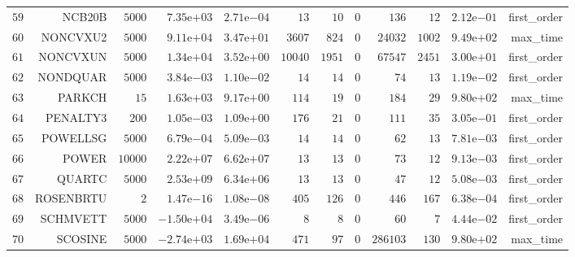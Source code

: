 \begin{longtable}{rrrrrrrrrrrr}
  \(    59\) & NCB20B & \(  5000\) & \( 7.35\)e\(+03\) & \( 2.71\)e\(-04\) & \(    13\) & \(    10\) & \(     0\) & \(   136\) & \(    12\) & \( 2.12\)e\(-01\) & first\_order \\
  \(    60\) & NONCVXU2 & \(  5000\) & \( 9.11\)e\(+04\) & \( 3.47\)e\(+01\) & \(  3607\) & \(   824\) & \(     0\) & \( 24032\) & \(  1002\) & \( 9.49\)e\(+02\) & max\_time \\
  \(    61\) & NONCVXUN & \(  5000\) & \( 1.34\)e\(+04\) & \( 3.52\)e\(+00\) & \( 10040\) & \(  1951\) & \(     0\) & \( 67547\) & \(  2451\) & \( 3.00\)e\(+01\) & first\_order \\
  \(    62\) & NONDQUAR & \(  5000\) & \( 3.84\)e\(-03\) & \( 1.10\)e\(-02\) & \(    14\) & \(    14\) & \(     0\) & \(    74\) & \(    13\) & \( 1.19\)e\(-02\) & first\_order \\
  \(    63\) & PARKCH & \(    15\) & \( 1.63\)e\(+03\) & \( 9.17\)e\(+00\) & \(   114\) & \(    19\) & \(     0\) & \(   184\) & \(    29\) & \( 9.80\)e\(+02\) & max\_time \\
  \(    64\) & PENALTY3 & \(   200\) & \( 1.05\)e\(-03\) & \( 1.09\)e\(+00\) & \(   176\) & \(    21\) & \(     0\) & \(   111\) & \(    35\) & \( 3.05\)e\(-01\) & first\_order \\
  \(    65\) & POWELLSG & \(  5000\) & \( 6.79\)e\(-04\) & \( 5.09\)e\(-03\) & \(    14\) & \(    14\) & \(     0\) & \(    62\) & \(    13\) & \( 7.81\)e\(-03\) & first\_order \\
  \(    66\) & POWER & \( 10000\) & \( 2.22\)e\(+07\) & \( 6.62\)e\(+07\) & \(    13\) & \(    13\) & \(     0\) & \(    73\) & \(    12\) & \( 9.13\)e\(-03\) & first\_order \\
  \(    67\) & QUARTC & \(  5000\) & \( 2.53\)e\(+09\) & \( 6.34\)e\(+06\) & \(    13\) & \(    13\) & \(     0\) & \(    47\) & \(    12\) & \( 5.08\)e\(-03\) & first\_order \\
  \(    68\) & ROSENBRTU & \(     2\) & \( 1.47\)e\(-16\) & \( 1.08\)e\(-08\) & \(   405\) & \(   126\) & \(     0\) & \(   446\) & \(   167\) & \( 6.38\)e\(-04\) & first\_order \\
  \(    69\) & SCHMVETT & \(  5000\) & \(-1.50\)e\(+04\) & \( 3.49\)e\(-06\) & \(     8\) & \(     8\) & \(     0\) & \(    60\) & \(     7\) & \( 4.44\)e\(-02\) & first\_order \\
  \(    70\) & SCOSINE & \(  5000\) & \(-2.74\)e\(+03\) & \( 1.69\)e\(+04\) & \(   471\) & \(    97\) & \(     0\) & \(286103\) & \(   130\) & \( 9.80\)e\(+02\) & max\_time \\

\end{longtable}
